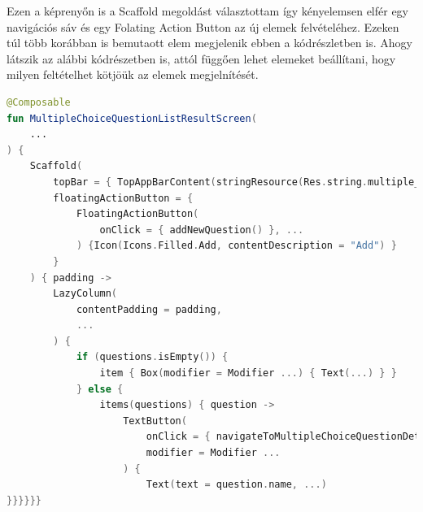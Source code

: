 Ezen a képrenyőn is a Scaffold megoldást választottam így kényelemsen elfér egy navigációs sáv és egy Folating Action Button az új elemek felvételéhez.
Ezeken túl több korábban is bemutaott elem megjelenik ebben a kódrészletben is.
Ahogy látszik az alábbi kódrészetben is, attól függően lehet elemeket beállítani, hogy milyen feltételhet kötjöük az elemek megjelnítését.
\begin{lstlisting}[caption={Listázó képernyő.}, label={lst:ListScreen}, language=Kotlin]
@Composable
fun MultipleChoiceQuestionListResultScreen(
    ...
) {
    Scaffold(
        topBar = { TopAppBarContent(stringResource(Res.string.multiple_choice_question_list), navigateBack) },
        floatingActionButton = {
            FloatingActionButton(
                onClick = { addNewQuestion() }, ...
            ) {Icon(Icons.Filled.Add, contentDescription = "Add") }
        }
    ) { padding ->
        LazyColumn(
            contentPadding = padding,
            ...
        ) {
            if (questions.isEmpty()) {
                item { Box(modifier = Modifier ...) { Text(...) } }
            } else {
                items(questions) { question ->
                    TextButton(
                        onClick = { navigateToMultipleChoiceQuestionDetails(question.uuid) },
                        modifier = Modifier ...
                    ) {
                        Text(text = question.name, ...)
}}}}}}
\end{lstlisting}

